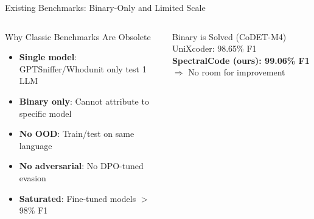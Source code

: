 \documentclass[aspectratio=169, 10pt]{beamer}
\begin{document}
\begin{frame}{Existing Benchmarks: Binary-Only and Limited Scale}
\begin{columns}[T]
\begin{alertblock}{Why Classic Benchmarks Are Obsolete}
\small
\begin{itemize}\setlength\itemsep{2pt}
    \item[\ding{55}] \textbf{Single model}: GPTSniffer/Whodunit only test 1 LLM
    \item[\ding{55}] \textbf{Binary only}: Cannot attribute to specific model
    \item[\ding{55}] \textbf{No OOD}: Train/test on same language
    \item[\ding{55}] \textbf{No adversarial}: No DPO-tuned evasion
    \item[\ding{55}] \textbf{Saturated}: Fine-tuned models $>$98\% F1
\end{itemize}
\end{alertblock}

\begin{exampleblock}{\scriptsize Binary is Solved (CoDET-M4)}
\scriptsize
UniXcoder: 98.65\% F1\\
\textbf{SpectralCode (ours): 99.06\% F1}\\
$\Rightarrow$ \alert{No room for improvement}
\end{exampleblock}
\end{columns}
\end{frame}
\end{document}
